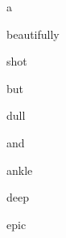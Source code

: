 \documentclass[varwidth]{standalone}
\begin{document}
\begin{CJK*}{UTF8}{gbsn}
{\setlength{\fboxsep}{0pt}\colorbox{white!0}{\parbox{0.8\textwidth}{
\colorbox{red!30.528576}{\strut a} \colorbox{red!52.695496}{\strut beautifully} \colorbox{red!10.362045}{\strut shot} \colorbox{red!14.595313}{\strut but} \colorbox{blue!30.608479}{\strut dull} \colorbox{red!9.7917}{\strut and} \colorbox{blue!1.9938778}{\strut ankle} \colorbox{red!6.291081}{\strut deep} \colorbox{red!50.51418}{\strut epic} 
}}}
\end{CJK*}
\end{document}
